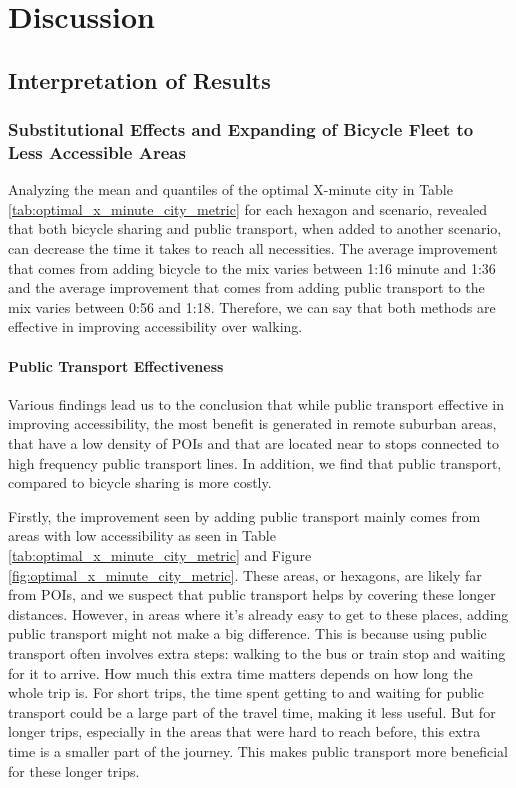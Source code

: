 \clearpage
\section{Discussion}
\label{sec:discussion}

\subsection{Interpretation of Results}
\subsubsection{Substitutional Effects and Expanding of Bicycle Fleet to Less Accessible Areas}

Analyzing the mean and quantiles of the optimal X-minute city in Table \ref{tab:optimal_x_minute_city_metric} for each hexagon and scenario, revealed that both bicycle sharing and public transport, when added to another scenario, can decrease the time it takes to reach all necessities.
The average improvement that comes from adding bicycle to the mix varies between 1:16 minute and 1:36 and the average improvement that comes from adding public transport to the mix varies between 0:56 and 1:18.
Therefore, we can say that both methods are effective in improving accessibility over walking.


\paragraph{Public Transport Effectiveness}
Various findings lead us to the conclusion that while public transport effective in improving accessibility, the most benefit is generated in remote suburban areas, that have a low density of POIs and that are located near to stops connected to high frequency public transport lines.
In addition, we find that public transport, compared to bicycle sharing is more costly.

Firstly, the improvement seen by adding public transport mainly comes from areas with low accessibility as seen in Table \ref{tab:optimal_x_minute_city_metric} and Figure \ref{fig:optimal_x_minute_city_metric}.
These areas, or hexagons, are likely far from POIs, and we suspect that  public transport helps by covering these longer distances. 
However, in areas where it's already easy to get to these places, adding public transport might not make a big difference. 
This is because using public transport often involves extra steps: walking to the bus or train stop and waiting for it to arrive. 
How much this extra time matters depends on how long the whole trip is.
For short trips, the time spent getting to and waiting for public transport could be a large part of the travel time, making it less useful. 
But for longer trips, especially in the areas that were hard to reach before, this extra time is a smaller part of the journey. 
This makes public transport more beneficial for these longer trips. 

